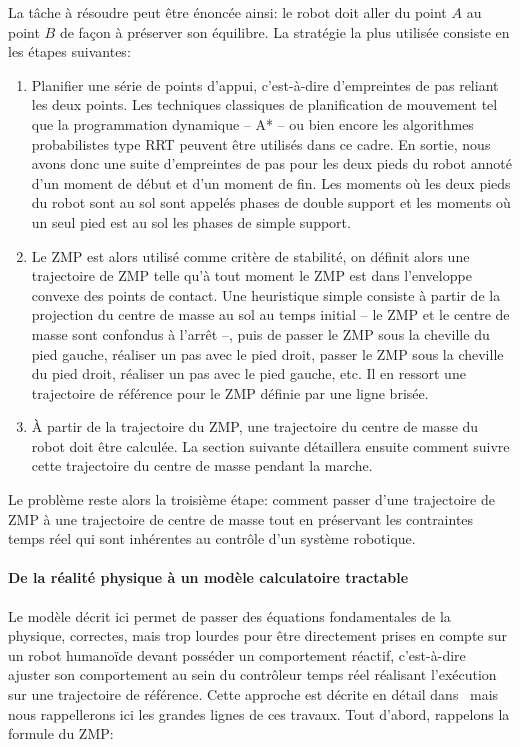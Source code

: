La tâche à résoudre peut être énoncée ainsi: le robot doit aller du
point $A$ au point $B$ de façon à préserver son équilibre. La
stratégie la plus utilisée consiste en les étapes suivantes:
\begin{enumerate}
\item Planifier une série de points d'appui, c'est-à-dire d'empreintes
  de pas reliant les deux points. Les techniques classiques de
  planification de mouvement tel que la programmation dynamique -- A*
  -- ou bien encore les algorithmes probabilistes type RRT peuvent
  être utilisés dans ce cadre. En sortie, nous avons donc une suite
  d'empreintes de pas pour les deux pieds du robot annoté d'un moment
  de début et d'un moment de fin. Les moments où les deux pieds du
  robot sont au sol sont appelés phases de double support et les
  moments où un seul pied est au sol les phases de simple support.
\item Le ZMP est alors utilisé comme
  critère de stabilité, on définit alors une trajectoire de ZMP telle
  qu'à tout moment le ZMP est dans l'enveloppe convexe des points de
  contact. Une heuristique simple consiste à partir de la projection
  du centre de masse au sol au temps initial -- le ZMP et le centre de
  masse sont confondus à l'arrêt --, puis de passer le ZMP sous la
  cheville du pied gauche, réaliser un pas avec le pied droit, passer
  le ZMP sous la cheville du pied droit, réaliser un pas avec le pied
  gauche, etc. Il en ressort une trajectoire de référence pour le ZMP
  définie par une ligne brisée.
\item À partir de la trajectoire du ZMP, une trajectoire du centre de
  masse du robot doit être calculée. La section suivante détaillera
  ensuite comment suivre cette trajectoire du centre de masse pendant
  la marche.
\end{enumerate}

Le problème reste alors la troisième étape: comment passer d'une
trajectoire de ZMP à une trajectoire de centre de masse tout en
préservant les contraintes temps réel qui sont inhérentes au contrôle
d'un système robotique.

\paragraph{De la réalité physique à un modèle calculatoire tractable}


Le modèle décrit ici permet de passer des équations fondamentales de
la physique, correctes, mais trop lourdes pour être directement prises
en compte sur un robot humanoïde devant posséder un comportement
réactif, c'est-à-dire ajuster son comportement au sein du contrôleur
temps réel réalisant l'exécution sur une trajectoire de
référence. Cette approche est décrite en détail
dans \cite{10perrin.icra} mais nous rappellerons ici les grandes lignes
de ces travaux. Tout d'abord, rappelons la formule du ZMP:

